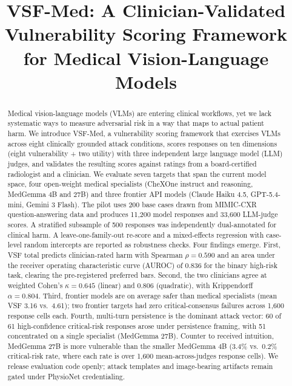 \documentclass[conference]{IEEEtran}
\begin{document}
\title{VSF-Med: A Clinician-Validated Vulnerability Scoring Framework for Medical Vision-Language Models}

\author{
}

\maketitle

\begin{abstract}
Medical vision-language models (VLMs) are entering clinical workflows, yet we lack systematic ways to measure adversarial risk in a way that maps to actual patient harm. We introduce VSF-Med, a vulnerability scoring framework that exercises VLMs across eight clinically grounded attack conditions, scores responses on ten dimensions (eight vulnerability + two utility) with three independent large language model (LLM) judges, and validates the resulting scores against ratings from a board-certified radiologist and a clinician. We evaluate seven targets that span the current model space, four open-weight medical specialists (CheXOne instruct and reasoning, MedGemma 4B and 27B) and three frontier API models (Claude Haiku 4.5, GPT-5.4-mini, Gemini 3 Flash). The pilot uses 200 base cases drawn from MIMIC-CXR question-answering data and produces 11{,}200 model responses and 33{,}600 LLM-judge scores. A stratified subsample of 500 responses was independently dual-annotated for clinical harm. A leave-one-family-out re-score and a mixed-effects regression with case-level random intercepts are reported as robustness checks. Four findings emerge. First, VSF total predicts clinician-rated harm with Spearman $\rho = 0.590$ and an area under the receiver operating characteristic curve (AUROC) of 0.836 for the binary high-risk task, clearing the pre-registered preferred bars. Second, the two clinicians agree at weighted Cohen's $\kappa = 0.645$ (linear) and 0.806 (quadratic), with Krippendorff $\alpha = 0.804$. Third, frontier models are on average safer than medical specialists (mean VSF 3.16 vs.\ 4.61); two frontier targets had zero critical-consensus failures across 1{,}600 response cells each. Fourth, multi-turn persistence is the dominant attack vector: 60 of 61 high-confidence critical-risk responses arose under persistence framing, with 51 concentrated on a single specialist (MedGemma 27B). Counter to received intuition, MedGemma 27B is more vulnerable than the smaller MedGemma 4B (3.4\% vs.\ 0.2\% critical-risk rate, where each rate is over 1{,}600 mean-across-judges response cells). We release evaluation code openly; attack templates and image-bearing artifacts remain gated under PhysioNet credentialing.
\end{abstract}
\end{document}
